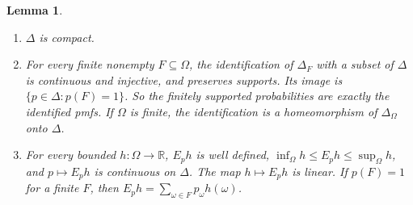 \documentclass[11pt]{article}
\newtheorem{lemma}[theorem]{Lemma}
\theoremstyle{definition}
\theoremstyle{remark}
\begin{document}
\begingroup\color{red}
\begin{lemma}\label{lem:probabilities}
\leavevmode
\begin{enumerate}[label=(\alph*)]
\item $\Delta$ is compact.
\item For every finite nonempty $F\subseteq\Omega$, the identification of $\Delta_F$ with a subset of $\Delta$ is continuous and injective, and preserves supports. Its image is $\{p\in\Delta:p(F)=1\}$. So the finitely supported probabilities are exactly the identified pmfs. If $\Omega$ is finite, the identification is a homeomorphism of $\Delta_\Omega$ onto $\Delta$.
\item For every bounded $h:\Omega\to\mathbb R$, $E_ph$ is well defined, $\inf_\Omega h\le E_ph\le\sup_\Omega h$, and $p\mapsto E_ph$ is continuous on $\Delta$. The map $h\mapsto E_ph$ is linear. If $p(F)=1$ for a finite $F$, then $E_ph=\sum_{\omega\in F}p_\omega h(\omega)$.
\end{enumerate}
\end{lemma}
\end{document}
